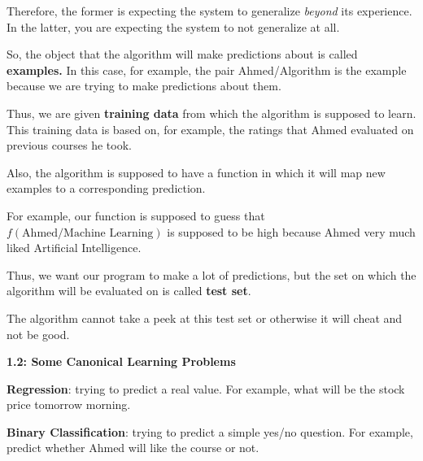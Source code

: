 \documentclass{article}
\begin{document}
\vspace{0.5cm}

Therefore, the former is expecting the system to generalize \textit{beyond} its experience.
In the latter, you are expecting the system to not generalize at all.

\vspace{0.5cm}

So, the object that the algorithm will make predictions about is called \textbf{examples.}
In this case, for example, the pair Ahmed/Algorithm is the example because we are trying to make predictions about them.

\vspace{0.5cm}

Thus, we are given \textbf{training data} from which the algorithm is supposed to learn. This training data is based on, for example, the ratings that Ahmed evaluated on previous courses he took.

\vspace{0.5cm}

Also, the algorithm is supposed to have a function in which it will map new examples to a corresponding prediction.

For example, our function is supposed to guess that $f(\text{Ahmed/Machine Learning})$ is supposed to be high
because Ahmed very much liked Artificial Intelligence.

\vspace{0.5cm}

Thus, we want our program to make a lot of predictions, but the set on which the algorithm will be evaluated on is called  \textbf{test set}.

\vspace{0.5cm}

The algorithm cannot take a peek at this test set or otherwise it will cheat and not be good.

\newpage

\Huge \textbf{1.2: Some Canonical Learning Problems}

\vspace{0.7cm}

\large \textbf{Regression}: trying to predict a real value. For example, what will be the stock price tomorrow morning.

\vspace{0.5cm}

\textbf{Binary Classification}: trying to predict a simple yes/no question. For example, predict whether Ahmed will like the course or not.
\end{document}

